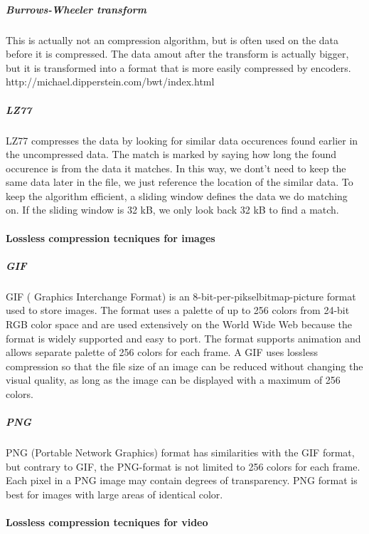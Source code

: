 \subparagraph{Burrows-Wheeler transform } \hfill
\newline
This is actually not an compression algorithm, but is often used on the data before it is compressed. The data amout after the transform is actually bigger, but it is transformed into a format that is more easily compressed by encoders. http://michael.dipperstein.com/bwt/index.html
\cite{bib:burrowsWheelerTransform}

\pagebreak

\subparagraph{LZ77} \hfill
\newline
LZ77 compresses the data by looking for similar data occurences found earlier in the uncompressed data. The match is marked by saying how long the found occurence is from the data it matches. In this way, we dont't need to keep the same data later in the file, we just reference the location of the similar data. To keep the algorithm efficient, a sliding window defines the data we do matching on. If the sliding window is 32 kB, we only look back 32 kB to find a match.
\cite{bib:LZ77}

\paragraph{Lossless compression tecniques for images}
\subparagraph{GIF} \hfill
\newline
GIF ( Graphics Interchange Format) is an 8-bit-per-pikselbitmap-picture format used to store images. The format uses a palette of up to 256 colors from 24-bit RGB color space and are used extensively on the World Wide Web because the format is widely supported and easy to port. The format supports animation and allows separate palette of 256 colors for each frame. A GIF uses lossless compression so that the file size of an image can be reduced without changing the visual quality, as long as the image can be displayed with a maximum of 256 colors. \cite{bib:GIF} \cite{bib:gifSicle}

\subparagraph{PNG} \hfill
\newline
PNG (Portable Network Graphics) format has similarities with the GIF format, but contrary to GIF, the PNG-format is not limited to 256 colors for each frame. Each pixel in a PNG image may contain degrees of transparency. PNG format is best for images with large areas of identical color. \cite{bib:PNG}

\paragraph{Lossless compression tecniques for video}

